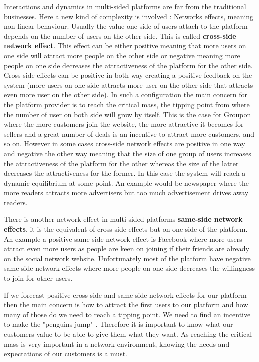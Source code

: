 \documentclass[10pt]{report}
\begin{document}
Interactions and dynamics in multi-sided platforms are far from the traditional businesses. Here a new kind of complexity is involved : Networks effects, meaning non linear behaviour. Usually the value one side of users attach to the platform depends on the number of users on the other side. This is called \textbf{cross-side network effect}. This effect can be either positive meaning that more users on one side will attract more people on the other side or negative meaning more people on one side decreases the attractiveness of the platform for the other side. Cross side effects can be positive in both way creating a positive feedback on the system (more users on one side attracts more user on the other side that attracts even more user on the other side). In such a configuration the main concern for the platform provider is to reach the critical mass, the tipping point from where the number of user on both side will grow by itself. \autocite{eisenmann2006strategies} This is the case for Groupon where the more customers join the website, the more attractive it becomes for sellers and a great number of deals is an incentive to attract more customers, and so on. However in some cases cross-side network effects are positive in one way and negative the other way meaning that the size of one group of users increases the attractiveness of the platform for the other whereas the size of the latter decreases the attractiveness for the former. In this case the system will reach a dynamic equilibrium at some point. An example would be newspaper where the more readers attracts more advertisers but too much advertisement drives away readers. \autocite{ParkerA05}

There is another network effect in multi-sided platforms \textbf{same-side network effects}, it is the equivalent of cross-side effects but on one side of the platform. An example a positive same-side network effect is Facebook where more users attract even more users as people are keen on joining if their friends are already on the social network website. Unfortunately most of the platform have negative same-side network effects where more people on one side decreases the willingness to join for other users.

If we forecast positive cross-side and same-side network effects for our platform then the main concern is how to attract the first users to our platform and how many of those do we need to reach a tipping point. We need to find an incentive to make the "penguins jump" \autocite{coursKyle}. Therefore it is important to know what our customers value to be able to give them what they want. As reaching the critical mass is very important in a network environment, knowing the needs and expectations of our customers is a must. 
\end{document}
